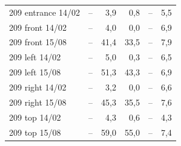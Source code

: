 \begin{tabular}{l rrr rr}
209 entrance 14/02 & -- & 3{,}9 & 0{,}8 & -- & 5{,}5 \\
209 front 14/02 & -- & 4{,}0 & 0{,}0 & -- & 6{,}9 \\
209 front 15/08 & -- & 41{,}4 & 33{,}5 & -- & 7{,}9 \\
209 left 14/02 & -- & 5{,}0 & 0{,}3 & -- & 6{,}5 \\
209 left 15/08 & -- & 51{,}3 & 43{,}3 & -- & 6{,}9 \\
209 right 14/02 & -- & 3{,}2 & 0{,}0 & -- & 6{,}6 \\
209 right 15/08 & -- & 45{,}3 & 35{,}5 & -- & 7{,}6 \\
209 top 14/02 & -- & 4{,}3 & 0{,}6 & -- & 4{,}3 \\
209 top 15/08 & -- & 59{,}0 & 55{,}0 & -- & 7{,}4 \\
\bottomrule
\end{tabular}
